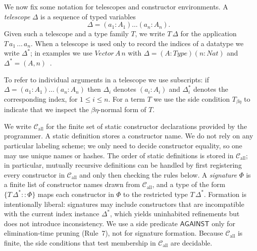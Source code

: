 \documentclass[a4paper, anonymous, UKenglish,cleveref, autoref, thm-restate]{lipics-v2021}
\begin{document}
We now fix some notation for telescopes and constructor environments. A \emph{telescope} $\Delta$ is a sequence of typed variables
\[
  \Delta = (a_{1} : A_{1}) \dots (a_{n} : A_{n}).
\]
Given such a telescope and a type family $T$, we write $T\,\Delta$ for the application $T\,a_{1}\,\dots\,a_{n}$. When a telescope is used only to record the indices of a datatype we write $\Delta^{*}$; in examples we use $Vector\,A\,n$ with $\Delta = (A : Type)(n : Nat)$ and $\Delta^{*} = (A,n)$~\cite{Norell2007TowardsAP}.

To refer to individual arguments in a telescope we use subscripts: if $\Delta = (a_{1} : A_{1})\dots(a_{n} : A_{n})$ then $\Delta_i$ denotes $(a_i : A_i)$ and $\Delta^{*}_{i}$ denotes the corresponding index, for $1 \leq i \leq n$. For a term $T$ we use the side condition $T_{\beta\eta}$ to indicate that we inspect the $\beta\eta$-normal form of $T$.

We write $\mathcal{C}_{\text{all}}$ for the finite set of static constructor declarations provided by the programmer. 
A static definition stores a constructor name. We do not rely on any particular labeling scheme; we only need to decide constructor equality, so one may use unique names or hashes.
The order of static definitions is stored in $\mathcal{C}_{\text{all}}$; in particular, mutually recursive definitions can be handled by first registering every constructor in $\mathcal{C}_{\text{all}}$ and only then checking the rules below. A \emph{signature} $\Phi$ is a finite list of constructor names drawn from $\mathcal{C}_{\text{all}}$, and a type of the form $\{T\,\Delta^{*} :: \Phi\}$ maps each constructor in $\Phi$ to the restricted type $T\,\Delta^{*}$. Formation is intentionally liberal: signatures may include constructors that are incompatible with the current index instance $\Delta^{*}$, which yields uninhabited refinements but does not introduce inconsistency. We use a side predicate $\mathsf{AGAINST}$ only for elimination-time pruning (Rule~7), not for signature formation. Because $\mathcal{C}_{\text{all}}$ is finite, the side conditions that test membership in $\mathcal{C}_{\text{all}}$ are decidable.
\end{document}
